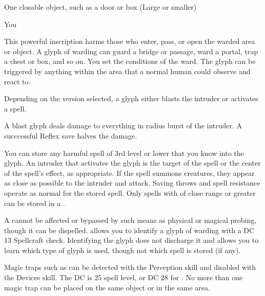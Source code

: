 \begin{spelltarget}{One closable object, such as a door or box (Large or smaller)}
\begin{spelltarget}{You}
\spelleffect \par This powerful inscription harms those who enter, pass, or open the warded area or object. A glyph of warding can guard a bridge or passage, ward a portal, trap a chest or box, and so on. You set the conditions of the ward. The glyph can be triggered by anything within the area that a normal human could observe and react to.
\par Depending on the version selected, a glyph either blasts the intruder or activates a spell.
\par {} A blast glyph deals damage to everything in \areasmall radius burst of the intruder. A succcessful Reflex save halves the damage.
\par {} You can store any harmful spell of 3rd level or lower that you know into the glyph. An intruder that activates the glyph is the target of the spell or the center of the spell's effect, as appropriate. If the spell summons creatures, they appear as close as possible to the intruder and attack. Saving throws and spell resistance operate as normal for the stored spell. Only spells with of close range or greater can be stored in a .
\spellnotes \par A  cannot be affected or bypassed by such means as physical or magical probing, though it can be dispelled.  allows you to identify a glyph of warding with a DC 13 Spellcraft check. Identifying the glyph does not discharge it and allows you to learn which type of glyph is used, though not which spell is stored (if any).
\par Magic traps such as  can be detected with the Perception skill and disabled with the Devices skill. The DC is 25 \add spell level, or DC 28 for . No more than one magic trap can be placed on the same object or in the same area.


\end{spelltarget}
\end{spelltarget}
